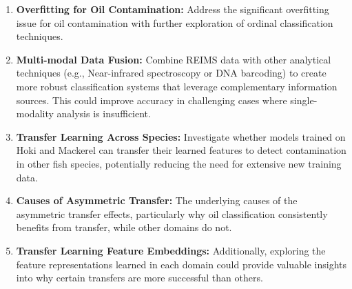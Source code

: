 \begin{enumerate}
    \item \textbf{Overfitting for Oil Contamination:} Address the significant overfitting issue for oil contamination with further exploration of ordinal classification techniques.
    \item \textbf{Multi-modal Data Fusion:} Combine REIMS data with other analytical techniques (e.g., Near-infrared spectroscopy or DNA barcoding) to create more robust classification systems that leverage complementary information sources. This could improve accuracy in challenging cases where single-modality analysis is insufficient.
    \item \textbf{Transfer Learning Across Species:} Investigate whether models trained on Hoki and Mackerel can transfer their learned features to detect contamination in other fish species, potentially reducing the need for extensive new training data.
    \item \textbf{Causes of Asymmetric Transfer:} The underlying causes of the asymmetric transfer effects, particularly why oil classification consistently benefits from transfer, while other domains do not.
    \item \textbf{Transfer Learning Feature Embeddings:} Additionally, exploring the feature representations learned in each domain could provide valuable insights into why certain transfers are more successful than others.
\end{enumerate}